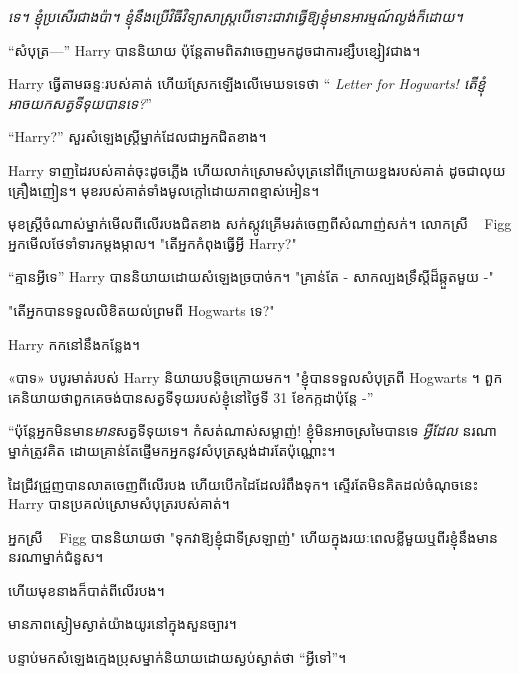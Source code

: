 \emph{ទេ។ ខ្ញុំប្រសើរជាងប៉ា។ ខ្ញុំ​នឹង​ប្រើ​វិធី​វិទ្យាសាស្ត្រ​ បើ​ទោះ​ជា​វា​ធ្វើ​ឱ្យ​ខ្ញុំ​មាន​អារម្មណ៍​ល្ងង់​ក៏​ដោយ។}

“សំបុត្រ—” Harry បាននិយាយ ប៉ុន្តែតាមពិតវាចេញមកដូចជាការខ្សឹបខ្សៀវជាង។

Harry ធ្វើតាមឆន្ទៈរបស់គាត់ ហើយស្រែកឡើងលើមេឃទទេថា “\emph{ Letter for Hogwarts! តើខ្ញុំអាចយកសត្វទីទុយបានទេ?}”

“Harry?” សួរ​សំឡេង​ស្ត្រី​ម្នាក់​ដែល​ជា​អ្នក​ជិត​ខាង។

Harry ទាញដៃរបស់គាត់ចុះដូចភ្លើង ហើយលាក់ស្រោមសំបុត្រនៅពីក្រោយខ្នងរបស់គាត់ ដូចជាលុយគ្រឿងញៀន។ មុខរបស់គាត់ទាំងមូលក្តៅដោយភាពខ្មាស់អៀន។

មុខ​ស្ត្រី​ចំណាស់​ម្នាក់​មើល​ពី​លើ​របង​ជិត​ខាង សក់​ស្កូវ​គ្រើម​រត់​ចេញ​ពី​សំណាញ់​សក់។ លោកស្រី ~ Figg អ្នកមើលថែទាំទារកម្តងម្កាល។ "តើអ្នកកំពុងធ្វើអ្វី Harry?"

“គ្មានអ្វីទេ” Harry បាននិយាយដោយសំឡេងច្របាច់ក។ "គ្រាន់តែ - សាកល្បងទ្រឹស្តីដ៏ឆ្កួតមួយ -"

"តើអ្នកបានទទួលលិខិតយល់ព្រមពី Hogwarts ទេ?"

Harry កកនៅនឹងកន្លែង។

«បាទ» បបូរមាត់របស់ Harry និយាយបន្តិចក្រោយមក។ "ខ្ញុំបានទទួលសំបុត្រពី Hogwarts ។ ពួកគេនិយាយថាពួកគេចង់បានសត្វទីទុយរបស់ខ្ញុំនៅថ្ងៃទី 31 ខែកក្កដាប៉ុន្តែ -”

“ប៉ុន្តែអ្នកមិនមាន\emph{មាន}សត្វទីទុយទេ។ កំសត់ណាស់សម្លាញ់! ខ្ញុំមិនអាចស្រមៃបានទេ \emph{អ្វីដែល} នរណាម្នាក់ត្រូវគិត ដោយគ្រាន់តែផ្ញើមកអ្នកនូវសំបុត្រស្តង់ដារតែប៉ុណ្ណោះ។

ដៃ​ជ្រីវជ្រួញ​បាន​លាត​ចេញ​ពី​លើ​របង ហើយ​បើក​ដៃ​ដែល​រំពឹង​ទុក។ ស្ទើរតែមិនគិតដល់ចំណុចនេះ Harry បានប្រគល់ស្រោមសំបុត្ររបស់គាត់។

អ្នកស្រី ~ Figg បាននិយាយថា "ទុកវាឱ្យខ្ញុំជាទីស្រឡាញ់" ហើយក្នុងរយៈពេលខ្លីមួយឬពីរខ្ញុំនឹងមាននរណាម្នាក់ជំនួស។

ហើយ​មុខ​នាង​ក៏​បាត់​ពី​លើ​របង។

មាន​ភាព​ស្ងៀម​ស្ងាត់​យ៉ាង​យូរ​នៅ​ក្នុង​សួន​ច្បារ។

បន្ទាប់​មក​សំឡេង​ក្មេង​ប្រុស​ម្នាក់​និយាយ​ដោយ​ស្ងប់​ស្ងាត់​ថា “អ្វី​ទៅ”។
